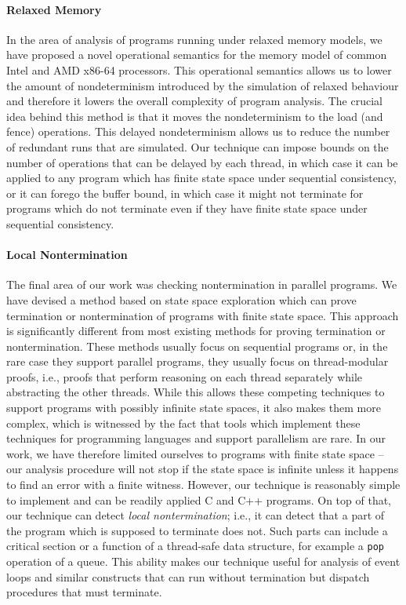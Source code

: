 \paragraph{Relaxed Memory}

In the area of analysis of programs running under relaxed memory models, we have proposed a novel operational semantics for the \xtso memory model of common Intel and AMD x86-64 processors.
This operational semantics allows us to lower the amount of nondeterminism introduced by the simulation of relaxed behaviour and therefore it lowers the overall complexity of program analysis.
The crucial idea behind this method is that it moves the nondeterminism to the load (and fence) operations.
This delayed nondeterminism allows us to reduce the number of redundant runs that are simulated.
Our technique can impose bounds on the number of operations that can be delayed by each thread, in which case it can be applied to any program which has finite state space under sequential consistency, or it can forego the buffer bound, in which case it might not terminate for programs which do not terminate even if they have finite state space under sequential consistency.

\paragraph{Local Nontermination}

The final area of our work was checking nontermination in parallel programs.
We have devised a method based on state space exploration which can prove termination or nontermination of programs with finite state space.
This approach is significantly different from most existing methods for proving termination or nontermination.
These methods usually focus on sequential programs or, in the rare case they support parallel programs, they usually focus on thread-modular proofs, i.e., proofs that perform reasoning on each thread separately while abstracting the other threads.
While this allows these competing techniques to support programs with possibly infinite state spaces, it also makes them more complex, which is witnessed by the fact that tools which implement these techniques for programming languages and support parallelism are rare.
In our work, we have therefore limited ourselves to programs with finite state space -- our analysis procedure will not stop if the state space is infinite unless it happens to find an error with a finite witness.
However, our technique is reasonably simple to implement and can be readily applied C and C++ programs.
On top of that, our technique can detect \emph{local nontermination}; i.e., it can detect that a part of the program which is supposed to terminate does not.
Such parts can include a critical section or a function of a thread-safe data structure, for example a \texttt{pop} operation of a queue.
This ability makes our technique useful for analysis of event loops and similar constructs that can run without termination but dispatch procedures that must terminate.


